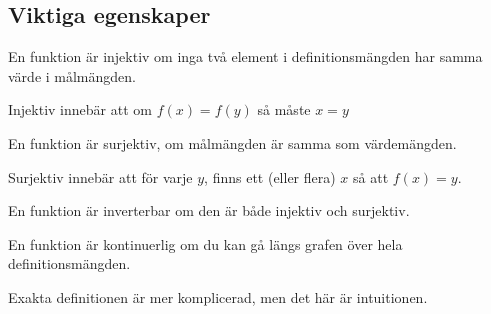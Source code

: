 \subsection{Viktiga egenskaper}

\begin{definition}[Injektiv]
	En funktion är injektiv om inga två element i definitionsmängden har samma värde i målmängden.
\end{definition}

\begin{obs}
	Injektiv innebär att om \(f(x) = f(y)\) så måste \(x = y\)
\end{obs}


\begin{definition}[Surjektiv]
	En funktion är surjektiv, om målmängden är samma som värdemängden.	
\end{definition}

\begin{obs}
	Surjektiv innebär att för varje \(y\), finns ett (eller flera) \(x\) så att \(f(x) = y\).
\end{obs}

\begin{definition}[Inverterbar]
	En funktion är inverterbar om den är både injektiv och surjektiv.
\end{definition}

\begin{definition}
	En funktion är kontinuerlig om du kan gå längs grafen över hela definitionsmängden.	
\end{definition}

\begin{obs}
	Exakta definitionen är mer komplicerad, men det här är intuitionen.
\end{obs}

